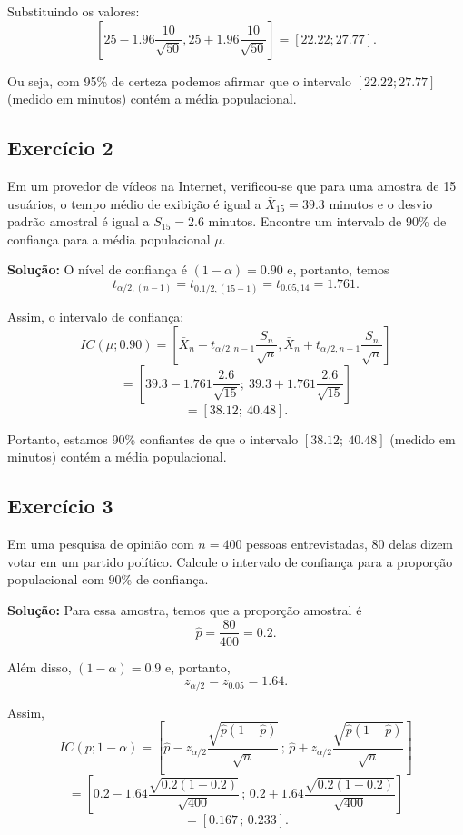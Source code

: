 \documentclass{article}
\begin{document}
Substituindo os valores:
    $$
    \left[
    25 - 1.96 \frac{10}{\sqrt{50}},
    25 + 1.96 \frac{10}{\sqrt{50}}
    \right]
    =
    [22.22; 27.77].
    $$

Ou seja, com 95\% de certeza podemos afirmar que o intervalo 
$[22.22; 27.77]$ (medido em minutos) contém a média populacional.

\subsection{Exercício 2}
Em um provedor de vídeos na Internet, verificou-se que para uma amostra de 15 usuários, o tempo médio de exibição é igual a $\bar{X}_{15} = 39.3$ minutos e o desvio padrão amostral é igual a $S_{15} = 2.6$ minutos. Encontre um intervalo de 90\% de confiança para a média populacional $\mu$.

\vspace{0.5cm}
\textbf{Solução:}
O nível de confiança é $(1 - \alpha) = 0.90$ e, portanto, temos
    $$
    t_{\alpha/2,(n-1)} = t_{0.1/2,(15-1)} = t_{0.05,14} = 1.761.
    $$
    
Assim, o intervalo de confiança:
    $$
    IC(\mu; 0.90) = 
    \left[
    \bar{X}_n - t_{\alpha/2,n-1} \frac{S_n}{\sqrt{n}}, 
    \bar{X}_n + t_{\alpha/2,n-1} \frac{S_n}{\sqrt{n}}
    \right]
    $$
    $$
    = 
    \left[
    39.3 - 1.761 \frac{2.6}{\sqrt{15}};\ 
    39.3 + 1.761 \frac{2.6}{\sqrt{15}}
    \right]
    $$
    $$
    = [38.12;\ 40.48].
    $$

Portanto, estamos 90\% confiantes de que o intervalo $[38.12;\ 40.48]$ (medido em minutos) contém a média populacional.

\subsection{Exercício 3}
Em uma pesquisa de opinião com $n = 400$ pessoas entrevistadas, 80 delas dizem votar em um partido político. Calcule o intervalo de confiança para a proporção populacional com 90\% de confiança.

\vspace{0.5cm}
\textbf{Solução:}
Para essa amostra, temos que a proporção amostral é 
    $$
    \hat{p} = \frac{80}{400} = 0.2.
    $$

Além disso, $(1 - \alpha) = 0.9$ e, portanto,
    $$
    z_{\alpha/2} = z_{0.05} = 1.64.
    $$

Assim,
    $$
    IC(p; 1 - \alpha) = \left[ \hat{p} - z_{\alpha/2} \frac{\sqrt{\hat{p}(1-\hat{p})}}{\sqrt{n}} \, ; \, \hat{p} + z_{\alpha/2} \frac{\sqrt{\hat{p}(1-\hat{p})}}{\sqrt{n}} \right]
    $$
    $$
    = \left[ 0.2 - 1.64 \frac{\sqrt{0.2(1-0.2)}}{\sqrt{400}} \, ; \, 0.2 + 1.64 \frac{\sqrt{0.2(1-0.2)}}{\sqrt{400}} \right]
    $$
    $$
    = [0.167 \, ; \, 0.233].
    $$
\end{document}
